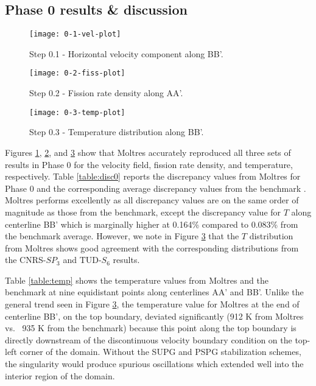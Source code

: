 \subsection{Phase 0 results \& discussion}
%
\begin{figure}[h!]
	\centering
    \texttt{[image: 0-1-vel-plot]}
	\caption{Step 0.1 - Horizontal velocity component along BB'.}
	\label{fig:0.1}
\end{figure}
%
\begin{figure}[h!]
	\centering
	\texttt{[image: 0-2-fiss-plot]}
	\caption{Step 0.2 - Fission rate density along AA'.}
	\label{fig:0.2}
\end{figure}
%
\begin{figure}[h!]
	\centering
	\texttt{[image: 0-3-temp-plot]}
	\caption{Step 0.3 - Temperature distribution along BB'.}
	\label{fig:0.3}
\end{figure}

Figures \ref{fig:0.1}, \ref{fig:0.2}, and \ref{fig:0.3} show that Moltres
accurately reproduced all three sets of results in Phase 0 for the velocity
field, fission rate density, and temperature, respectively.
Table \ref{table:disc0} reports the discrepancy values from Moltres for Phase 0
and the corresponding average discrepancy values from the benchmark
\citep{tiberga_results_2020}. Moltres performs excellently as all discrepancy
values are on the same order of magnitude as those from the benchmark,
except the discrepancy value for $T$ along centerline BB' which is marginally
higher at 0.164\% compared to 0.083\% from the benchmark average. However, we
note in Figure \ref{fig:0.3} that the $T$ distribution from Moltres shows good
agreement with the corresponding distributions from the CNRS-$SP_3$ and
TUD-$S_6$ results.

Table \ref{table:temp} shows the temperature values from Moltres and the
benchmark at nine equidistant points along centerlines AA' and BB'. Unlike the
general trend seen in Figure \ref{fig:0.3}, the
temperature value for Moltres at the end of centerline BB', on the top
boundary, deviated significantly (912 K from Moltres
vs. ~935 K from the benchmark) because this point along the top boundary is
directly downstream of the discontinuous velocity boundary condition on the
top-left corner of the domain. Without the SUPG and PSPG stabilization schemes,
the singularity would produce spurious oscillations which extended well into
the interior region of the domain. 

